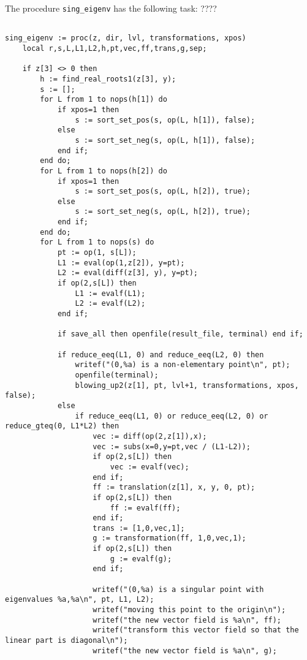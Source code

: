 \documentclass[a4paper,10pt]{article}
\begin{document}
\begin{lstlisting}[name=blowup]
\end{lstlisting}

The procedure \verb+sing_eigenv+ has the following task: ????

\begin{lstlisting}[name=blowup]

sing_eigenv := proc(z, dir, lvl, transformations, xpos)
    local r,s,L,L1,L2,h,pt,vec,ff,trans,g,sep;

    if z[3] <> 0 then
        h := find_real_roots1(z[3], y);
        s := [];
        for L from 1 to nops(h[1]) do
            if xpos=1 then
                s := sort_set_pos(s, op(L, h[1]), false);
            else
                s := sort_set_neg(s, op(L, h[1]), false);
            end if;
        end do;
        for L from 1 to nops(h[2]) do
            if xpos=1 then
                s := sort_set_pos(s, op(L, h[2]), true);
            else
                s := sort_set_neg(s, op(L, h[2]), true);
            end if;
        end do;
        for L from 1 to nops(s) do
            pt := op(1, s[L]);
            L1 := eval(op(1,z[2]), y=pt);
            L2 := eval(diff(z[3], y), y=pt);
            if op(2,s[L]) then
                L1 := evalf(L1);
                L2 := evalf(L2);
            end if;

            if save_all then openfile(result_file, terminal) end if;

            if reduce_eeq(L1, 0) and reduce_eeq(L2, 0) then
                writef("(0,%a) is a non-elementary point\n", pt);
                openfile(terminal);
                blowing_up2(z[1], pt, lvl+1, transformations, xpos, false);
            else
                if reduce_eeq(L1, 0) or reduce_eeq(L2, 0) or reduce_gteq(0, L1*L2) then
                    vec := diff(op(2,z[1]),x);
                    vec := subs(x=0,y=pt,vec / (L1-L2));
                    if op(2,s[L]) then
                        vec := evalf(vec);
                    end if;
                    ff := translation(z[1], x, y, 0, pt);
                    if op(2,s[L]) then
                        ff := evalf(ff);
                    end if;
                    trans := [1,0,vec,1];
                    g := transformation(ff, 1,0,vec,1);
                    if op(2,s[L]) then
                        g := evalf(g);
                    end if;

                    writef("(0,%a) is a singular point with eigenvalues %a,%a\n", pt, L1, L2);
                    writef("moving this point to the origin\n");
                    writef("the new vector field is %a\n", ff);
                    writef("transform this vector field so that the linear part is diagonal\n");
                    writef("the new vector field is %a\n", g);


\end{lstlisting}
\end{document}

